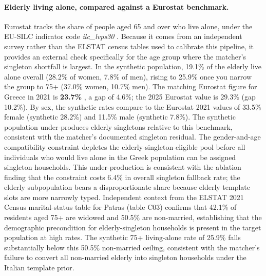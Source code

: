 \documentclass{article}
\begin{document}
\paragraph{Elderly living alone, compared against a Eurostat benchmark.}
Eurostat tracks the share of people aged 65 and over who live alone, under the EU-SILC indicator code \textit{ilc\_lvps30} \citep{Eurostat2025ilc_lvps30}. Because it comes from an independent survey rather than the ELSTAT census tables used to calibrate this pipeline, it provides an external check specifically for the age group where the matcher's singleton shortfall is largest. In the synthetic population, 19.1\% of the elderly live alone overall (28.2\% of women, 7.8\% of men), rising to 25.9\% once you narrow the group to 75+ (37.0\% women, 10.7\% men). The matching Eurostat figure for Greece in 2021 is \textbf{23.7\%} \citep{Eurostat2025ilc_lvps30}, a gap of 4.6\%; the 2025 Eurostat value is 29.3\% (gap 10.2\%). By sex, the synthetic rates compare to the Eurostat 2021 values of 33.5\% female (synthetic 28.2\%) and 11.5\% male (synthetic 7.8\%). The synthetic population under-produces elderly singletons relative to this benchmark, consistent with the matcher's documented singleton residual. The gender-and-age compatibility constraint depletes the elderly-singleton-eligible pool before all individuals who would live alone in the Greek population can be assigned singleton households. This under-production is consistent with the ablation finding that the constraint costs 6.4\% in overall singleton fallback rate; the elderly subpopulation bears a disproportionate share because elderly template slots are more narrowly typed. Independent context from the ELSTAT 2021 Census marital-status table for Patras (table C03) confirms that 42.1\% of residents aged 75+ are widowed and 50.5\% are non-married, establishing that the demographic precondition for elderly-singleton households is present in the target population at high rates. The synthetic 75+ living-alone rate of 25.9\% falls substantially below this 50.5\% non-married ceiling, consistent with the matcher's failure to convert all non-married elderly into singleton households under the Italian template prior.
\end{document}
